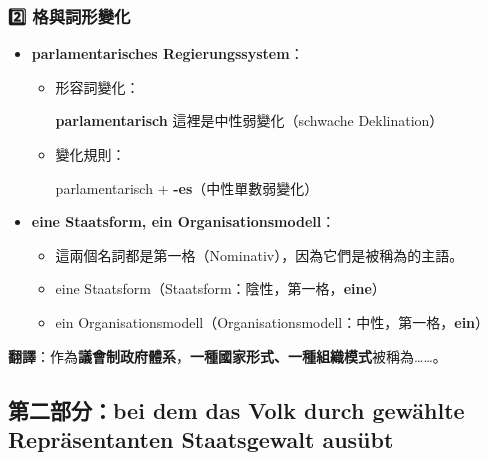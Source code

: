 \documentclass{article}
\begin{document}
\subsubsection{2️⃣ 格與詞形變化}
\begin{itemize}
    \item \textbf{parlamentarisches Regierungssystem}：
    \begin{itemize}
        \item 形容詞變化：
        \begin{tcolorbox}[colframe=purple!50, colback=purple!5, sharp corners]
            \textbf{parlamentarisch} 這裡是中性弱變化（schwache Deklination）
        \end{tcolorbox}
        \item 變化規則：
        \begin{tcolorbox}[colframe=orange!50, colback=orange!5, sharp corners]
            parlamentarisch + \textbf{-es}（中性單數弱變化）
        \end{tcolorbox}
    \end{itemize}
    \item \textbf{eine Staatsform, ein Organisationsmodell}：
    \begin{itemize}
        \item 這兩個名詞都是第一格（Nominativ），因為它們是被稱為的主語。
        \item eine Staatsform（Staatsform：陰性，第一格，\textbf{eine}）
        \item ein Organisationsmodell（Organisationsmodell：中性，第一格，\textbf{ein}）
    \end{itemize}
\end{itemize}

\textbf{翻譯}：作為\textbf{議會制政府體系}，\textbf{一種國家形式、一種組織模式}被稱為……。

\subsection{第二部分：bei dem das Volk durch gewählte Repräsentanten Staatsgewalt ausübt}
\end{document}
